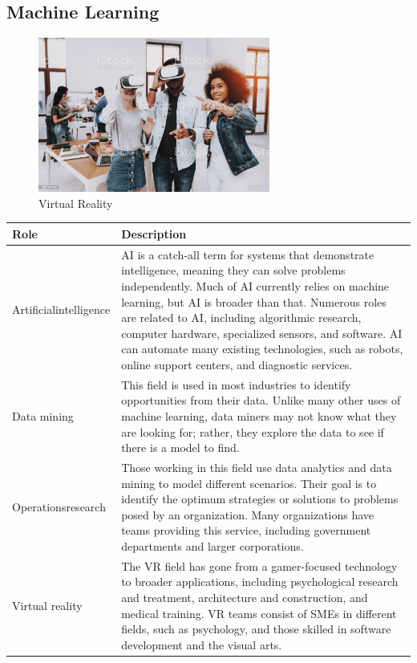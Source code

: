 \subsection{Machine Learning}

\begin{figure}[H]
	\begin{center}
		\caption{Virtual Reality}
		\vskip 4pt
		\includegraphics[height=2in]{images/careers/istockphoto-1051052494-1024x1024.jpg}
	\end{center}
\end{figure}

\begin{table}[H]
	\begin{center}
		\begin{tabular}{p{1in}|p{3.4in}} 
			\textbf{Role} & \textbf{Description}\\
			\hline
			Artificial\linebreak intelligence & AI is a catch-all term for systems that demonstrate intelligence, meaning they can solve problems independently. Much of AI currently relies on machine learning, but AI is broader than that. Numerous roles are related to AI, including algorithmic research, computer hardware, specialized sensors, and software. AI can automate many existing technologies, such as robots, online support centers, and diagnostic services.\\
			\hline
			Data mining & This field is used in most industries to identify opportunities from their data. Unlike many other uses of machine learning, data miners may not know what they are looking for; rather, they explore the data to see if there is a model to find.\\
			\hline
			Operations\linebreak research & Those working in this field use data analytics and data mining to model different scenarios. Their goal is to identify the optimum strategies or solutions to problems posed by an organization. Many organizations have teams providing this service, including government departments and larger corporations.\\
			\hline
			Virtual reality & The VR field has gone from a gamer-focused technology to broader applications, including psychological research and treatment, architecture and construction, and medical training. VR teams consist of SMEs in different fields, such as psychology, and those skilled in software development and the visual arts.\\
			\hline
		\end{tabular}
	\end{center}
\end{table}

